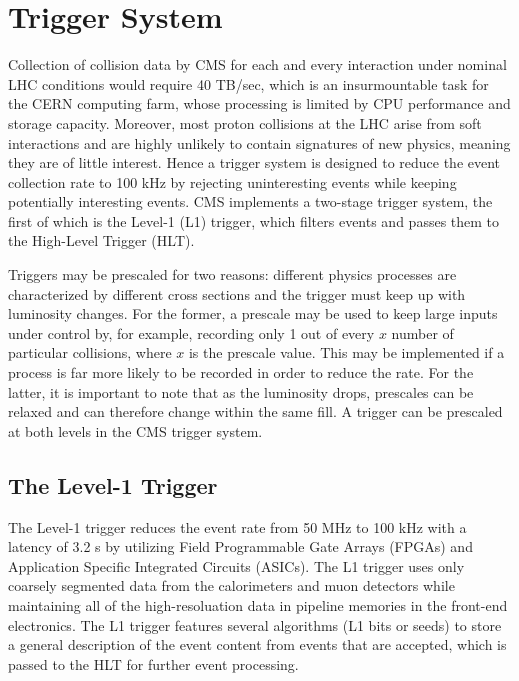 \section{Trigger System}
\label{sec:trigger}

Collection of collision data by CMS for each and every interaction under nominal LHC conditions would require 40 TB/sec, which is an insurmountable task for the CERN computing farm, whose processing is limited by CPU performance and storage capacity. Moreover, most proton collisions at the LHC arise from soft interactions and are highly unlikely to contain signatures of new physics, meaning they are of little interest. Hence a trigger system is designed to reduce the event collection rate to 100 kHz by rejecting uninteresting events while keeping potentially interesting events. CMS implements a two-stage trigger system, the first of which is the Level-1 (L1) trigger, which filters events and passes them to the High-Level Trigger (HLT).

Triggers may be prescaled for two reasons: different physics processes are characterized by different cross sections and the trigger must keep up with luminosity changes. For the former, a prescale may be used to keep large inputs under control by, for example, recording only 1 out of every $x$ number of particular collisions, where $x$ is the prescale value. This may be implemented if a process is far more likely to be recorded in order to reduce the rate. For the latter, it is important to note that as the luminosity drops, prescales can be relaxed and can therefore change within the same fill. A trigger can be prescaled at both levels in the CMS trigger system.

\subsection{The Level-1 Trigger}
\label{sec:L1_trig}

The Level-1 trigger reduces the event rate from 50 MHz to 100 kHz with a latency of 3.2 \micron s by utilizing Field Programmable Gate Arrays (FPGAs) and Application Specific Integrated Circuits (ASICs). The L1 trigger uses only coarsely segmented data from the calorimeters and muon detectors while maintaining all of the high-resoluation data in pipeline memories in the front-end electronics. The L1 trigger features several algorithms (L1 bits or seeds) to store a general description of the event content from events that are accepted, which is passed to the HLT for further event processing.



